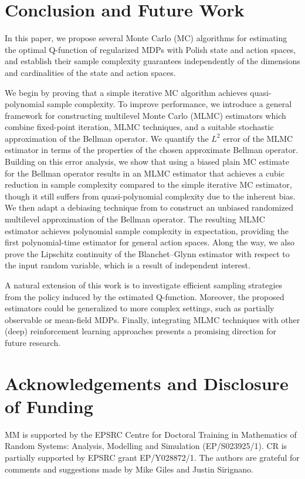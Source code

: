 \documentclass[11pt]{article}
\numberwithin{equation}{section}
\theoremstyle{definition}
\theoremstyle{remark}
\newcommand{\citet}{\cite}
\begin{document}
\section{Conclusion and Future Work}

In this paper, we propose several Monte Carlo (MC) algorithms for estimating the optimal Q-function of regularized MDPs with Polish state and action spaces, and establish their sample complexity guarantees   independently of the dimensions and cardinalities of the state and action spaces.

 We begin by proving that a simple iterative MC algorithm achieves quasi-polynomial sample complexity. 
 To improve performance, we introduce a general framework for constructing multilevel Monte Carlo (MLMC) estimators which combine fixed-point iteration, MLMC techniques, and a suitable stochastic approximation of the Bellman operator. 
 We quantify the $L^2$ error of the MLMC estimator in terms of the properties of the chosen approximate Bellman operator. 
 Building on this error analysis, we show that using a biased plain MC estimate for the Bellman operator results in an MLMC estimator that achieves a cubic reduction in sample complexity compared to the simple iterative MC estimator, though it still suffers from quasi-polynomial complexity due to the inherent bias. 
We then adapt a debiasing technique from \citet{blanchet2015unbiased} to construct an unbiased randomized multilevel approximation of the Bellman operator. 
 The resulting MLMC estimator achieves polynomial sample complexity in expectation, providing the first polynomial-time estimator for general action spaces. 
 Along the way, we also prove the Lipschitz continuity of the Blanchet--Glynn estimator with respect to the input random variable, which is a result of independent interest.

A natural extension of this work is to investigate efficient sampling strategies from the policy induced by the estimated Q-function. 
Moreover, the proposed estimators could be generalized to more complex settings, such as partially observable or mean-field MDPs. 
Finally, integrating MLMC techniques with other (deep) reinforcement learning approaches presents a promising direction for future research.

 

\section{Acknowledgements and Disclosure of Funding}
MM is supported by the EPSRC Centre for Doctoral
Training in Mathematics of Random Systems: Analysis, Modelling and Simulation (EP/S023925/1). CR is partially supported by EPSRC grant EP/Y028872/1. The authors are grateful for comments and suggestions made by Mike Giles and Justin Sirignano.
\end{document}
